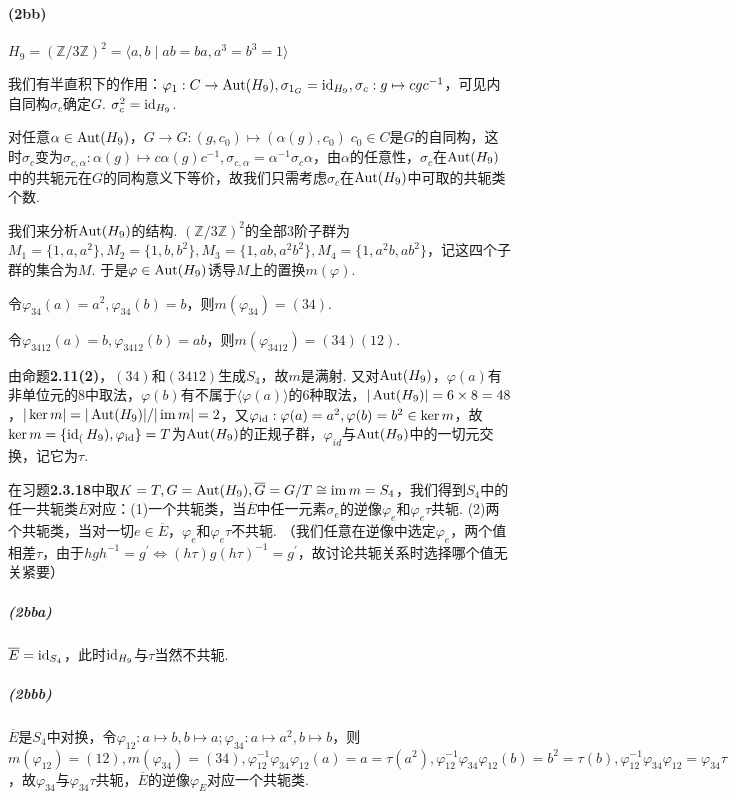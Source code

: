 \paragraph{(2bb)}
$H_9=(\mathbb{Z}/3\mathbb{Z})^2=\langle a,b\mid ab=ba, a^3=b^3=1\rangle$

我们有半直积下的作用：$\varphi_1: C\rightarrow \operatorname{Aut}(H_9), \sigma_{1_G}=\operatorname{id}_{H_9}, \sigma_c: g\mapsto cgc^{-1}$，可见内自同构$\sigma_c$确定$G$. $\sigma_c^2=\operatorname{id}_{H_9}$.

对任意$\alpha\in\operatorname{Aut}(H_9)$，$G\rightarrow G: (g, c_0)\mapsto (\alpha(g),c_0)\;c_0\in C$是$G$的自同构，这时$\sigma_c$变为$\sigma_{c,\alpha}: \alpha(g)\mapsto c\alpha(g)c^{-1}, \sigma_{c,\alpha}=\alpha^{-1}\sigma_c\alpha$，由$\alpha$的任意性，$\sigma_c$在$\operatorname{Aut}(H_9)$中的共轭元在$G$的同构意义下等价，故我们只需考虑$\sigma_c$在$\operatorname{Aut}(H_9)$中可取的共轭类个数.

我们来分析$\operatorname{Aut}(H_9)$的结构. $(\mathbb{Z}/3\mathbb{Z})^2$的全部$3$阶子群为
$M_1=\{1,a,a^2\}, M_2=\{1,b,b^2\}, M_3=\{1,ab,a^2b^2\}, M_4=\{1, a^2b,ab^2\}$，记这四个子群的集合为$M$. 于是$\varphi\in\operatorname{Aut}(H_9)$诱导$M$上的置换$m(\varphi)$.

令$\varphi_{34}(a)=a^2, \varphi_{34}(b)=b$，则$m(\varphi_{34})=(34)$.

令$\varphi_{3412}(a)=b, \varphi_{3412}(b)=ab$，则$m(\varphi_{3412})=(34)(12)$.

由{\heiti 命题}\textbf{2.11(2)}，$(34)$和$(3412)$生成$S_4$，故$m$是满射. 又对$\operatorname{Aut}(H_9)$，$\varphi(a)$有非单位元的$8$中取法，$\varphi(b)$有不属于$\langle \varphi(a)\rangle$的$6$种取法，$|\operatorname{Aut}(H_9)|=6\times8=48$，$|\ker m|=|\operatorname{Aut}(H_9)|/|\operatorname{im} m|=2$，又$\varphi_{\operatorname{id}}: \varphi(a)=a^2,\varphi(b)=b^2\in\ker m$，故$\ker m=\{\operatorname{id}_(H_9), \varphi_{\operatorname{id}}\}=T$为$\operatorname{Aut}(H_9)$的正规子群，$\varphi_{id}$与$\operatorname{Aut}(H_9)$中的一切元交换，记它为$\tau$.

在{\heiti 习题}\textbf{2.3.18}中取$K=T, G=\operatorname{Aut}(H_9), \overline{G}=G/T\cong\operatorname{im} m=S_4$，我们得到$S_4$中的任一共轭类$\overline{E}$对应：(1)一个共轭类，当$\overline{E}$中任一元素$\sigma_e$的逆像$\varphi_e$和$\varphi_e\tau$共轭. (2)两个共轭类，当对一切$e\in \overline{E}$，$\varphi_e$和$\varphi_e\tau$不共轭. （我们任意在逆像中选定$\varphi_e$，两个值相差$\tau$，由于$hgh^{-1}=g^{\prime}\Leftrightarrow(h\tau)g(h\tau)^{-1}=g^{\prime}$，故讨论共轭关系时选择哪个值无关紧要）

\subparagraph{(2bba)}
$\overline{E}=\operatorname{id}_{S_4}$，此时$\operatorname{id}_{H_9}$与$\tau$当然不共轭.

\subparagraph{(2bbb)}
$\overline{E}$是$S_4$中对换，令$\varphi_{12}: a\mapsto b, b\mapsto a;\varphi_{34}: a\mapsto a^2, b\mapsto b$，则$m(\varphi_{12})=(12),m(\varphi_{34})=(34),
\varphi_{12}^{-1}\varphi_{34}\varphi_{12}(a)=a=\tau(a^2),
\varphi_{12}^{-1}\varphi_{34}\varphi_{12}(b)=b^2=\tau(b),
\varphi_{12}^{-1}\varphi_{34}\varphi_{12}=\varphi_{34}\tau$，故$\varphi_{34}$与$\varphi_{34}\tau$共轭，$\overline{E}$的逆像$\varphi_E$对应一个共轭类.


